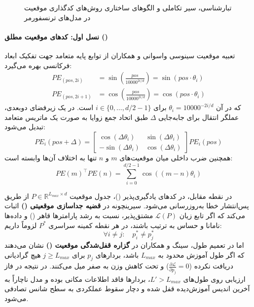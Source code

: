 \begin{figure}[htbp]
{%
}
\caption{تبارشناسی، سیر تکاملی و الگوهای ساختاری روش‌های کدگذاری موقعیت در مدل‌های ترنسفورمر}
\label{fig:pe_taxonomy_evolution}
\end{figure}

\paragraph*{نسل اول: کدهای موقعیت مطلق ()}
تعبیه موقعیت سینوسی واسوانی و همکاران \cite{vaswani2017attention, jiguo2026position} از توابع پایه متعامد جهت تفکیک ابعاد فرکانسی بهره می‌گیرد:
\begin{align}
    PE_{(pos, 2i)} &= \sin\left(\frac{pos}{10000^{2i/d}}\right) = \sin(pos \cdot \theta_i) \\
    PE_{(pos, 2i+1)} &= \cos\left(\frac{pos}{10000^{2i/d}}\right) = \cos(pos \cdot \theta_i)
\end{align}
که در آن $\theta_i = 10000^{-2i/d}$ برای $i \in \{0, \dots, d/2 - 1\}$ است. در یک زیرفضای دوبعدی، عملگر انتقال برای جابه‌جایی $\Delta$ طبق اتحاد جمع زوایا به صورت یک ماتریس متعامد تبدیل می‌شود:
\begin{equation}
    PE_i(pos + \Delta) = \begin{bmatrix} \cos(\Delta\theta_i) & \sin(\Delta\theta_i) \\ -\sin(\Delta\theta_i) & \cos(\Delta\theta_i) \end{bmatrix} PE_i(pos)
\end{equation}
همچنین ضرب داخلی میان موقعیت‌های $m$ و $n$ تنها به اختلاف آن‌ها وابسته است:
\begin{equation}
    PE(m)^\top PE(n) = \sum_{i=0}^{d/2 - 1} \cos((m - n)\theta_i)
\end{equation}

در نقطه مقابل، در کدهای یادگیری‌پذیر ()، جدول موقعیت $P \in \mathbb{R}^{L_{max} \times d}$ از طریق پس‌انتشار خطا به‌روزرسانی می‌شود. سیرینچونه \cite{cirrincione2026geometry} در \textbf{قضیه جداسازی موقعیتی ()} اثبات می‌کند که اگر تابع زیان $\mathcal{L}(P)$ مشتق‌پذیر، نسبت به رشد پارامترها قاهر () و داده‌ها نامانا و حساس به ترتیب باشند، در هر نقطه کمینه سراسری $P^*$ لزوماً داریم:
\begin{equation}
    \forall i \neq j: \quad p_i^* \neq p_j^*
\end{equation}
اما در تعمیم طول، سینگ و همکاران \cite{singh2026relative} در \textbf{گزاره قفل‌شدگی موقعیت ()} نشان می‌دهند که اگر طول آموزش محدود به $L_{max}$ باشد، بردارهای $p_j$ برای $j \ge L_{max}$ هیچ گرادیانی دریافت نکرده ($\frac{\partial \mathcal{L}}{\partial p_j} = 0$) و تحت کاهش وزن به صفر میل می‌کنند. در نتیجه در فاز ارزیابی روی طول‌های $L' > L_{max}$، بردارها فاقد اطلاعات مکانی بوده و مدل ناچاراً به آخرین اندیس آموزش‌دیده قفل شده و دچار سقوط عملکردی به سطح شانس تصادفی می‌شود.

